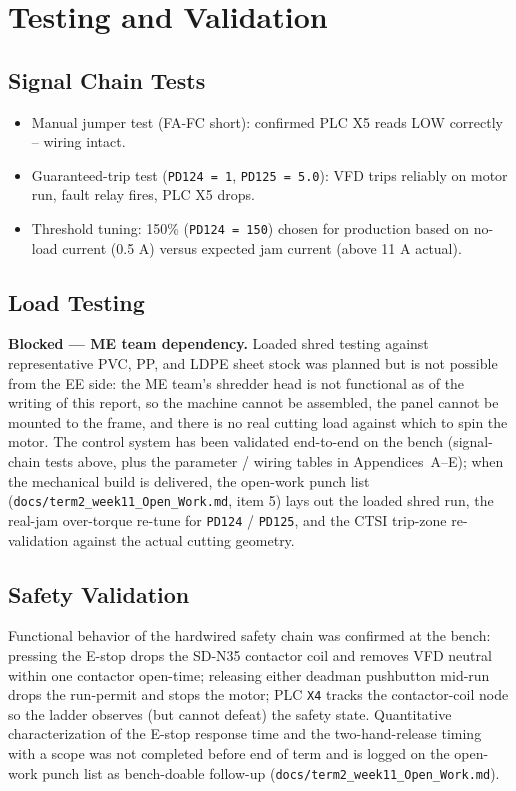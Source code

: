 \documentclass[hidelinks,12pt]{article}
\begin{document}
\section{Testing and Validation}

\subsection{Signal Chain Tests}
\begin{itemize}
    \item Manual jumper test (FA-FC short): confirmed PLC X5 reads LOW correctly -- wiring intact.
    \item Guaranteed-trip test (\texttt{PD124 = 1}, \texttt{PD125 = 5.0}): VFD trips reliably on motor run, fault relay fires, PLC X5 drops.
    \item Threshold tuning: 150\% (\texttt{PD124 = 150}) chosen for production based on no-load current (0.5 A) versus expected jam current (above 11 A actual).
\end{itemize}

\subsection{Load Testing}
\label{sec:loadtesting}

\textbf{Blocked --- ME team dependency.} Loaded shred testing against representative PVC, PP, and LDPE sheet stock was planned but is not possible from the EE side: the ME team's shredder head is not functional as of the writing of this report, so the machine cannot be assembled, the panel cannot be mounted to the frame, and there is no real cutting load against which to spin the motor. The control system has been validated end-to-end on the bench (signal-chain tests above, plus the parameter / wiring tables in Appendices~A--E); when the mechanical build is delivered, the open-work punch list (\texttt{docs/term2\_week11\_Open\_Work.md}, item 5) lays out the loaded shred run, the real-jam over-torque re-tune for \texttt{PD124} / \texttt{PD125}, and the CTSI trip-zone re-validation against the actual cutting geometry.

\subsection{Safety Validation}

Functional behavior of the hardwired safety chain was confirmed at the bench: pressing the E-stop drops the SD-N35 contactor coil and removes VFD neutral within one contactor open-time; releasing either deadman pushbutton mid-run drops the run-permit and stops the motor; PLC \texttt{X4} tracks the contactor-coil node so the ladder observes (but cannot defeat) the safety state. Quantitative characterization of the E-stop response time and the two-hand-release timing with a scope was not completed before end of term and is logged on the open-work punch list as bench-doable follow-up (\texttt{docs/term2\_week11\_Open\_Work.md}).
\end{document}
